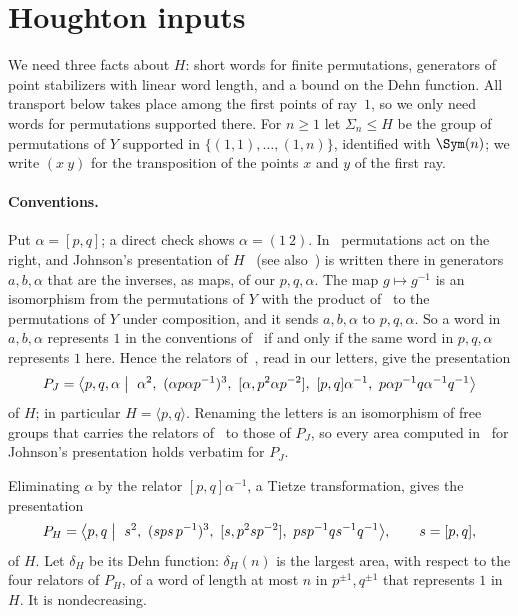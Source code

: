 \section{Houghton inputs}\label{sec:houghton}

We need three facts about $H$: short words for finite permutations, generators of point stabilizers with linear word length, and a bound on the
Dehn function. All transport below takes place among the first points of ray~$1$, so we only need words for permutations supported there. For
$n\ge1$ let $\Sigma_n\le H$ be the group of permutations of $Y$ supported in $\{(1,1),\dots,(1,n)\}$, identified with $\Sym(n)$; we write
$(x\ y)$ for the transposition of the points $x$ and $y$ of the first ray.

\paragraph{Conventions.} Put $\alpha=[p,q]$; a direct check shows $\alpha=(1\ 2)$. In~\cite{DouglasMghirbiA} permutations act on the right,
and Johnson's presentation of $H$~\cite{Johnson1999} (see also~\cite[Theorem~2.8]{Lee2012}) is written there in generators $a,b,\alpha$ that are the inverses, as maps,
of our $p,q,\alpha$. The map $g\mapsto g^{-1}$ is an isomorphism from the permutations of $Y$ with the product of~\cite{DouglasMghirbiA} to the
permutations of $Y$ under composition, and it sends $a,b,\alpha$ to $p,q,\alpha$. So a word in $a,b,\alpha$ represents $1$ in the conventions
of~\cite{DouglasMghirbiA} if and only if the same word in $p,q,\alpha$ represents $1$ here. Hence the relators of~\cite[Section~2]{DouglasMghirbiA},
read in our letters, give the presentation
\begin{equation}\label{eq:johnson}
P_J=\bigl\langle p,q,\alpha\bigm|\ \alpha^2,\ (\alpha p\alpha p^{-1})^3,\ [\alpha,p^2\alpha p^{-2}],\ [p,q]\alpha^{-1},\ p\alpha p^{-1}q\alpha^{-1}q^{-1}\bigr\rangle
\end{equation}
of $H$; in particular $H=\langle p,q\rangle$. Renaming the letters is an isomorphism of free groups that carries the relators
of~\cite{DouglasMghirbiA} to those of $P_J$, so every area computed in~\cite{DouglasMghirbiA} for Johnson's presentation holds verbatim for $P_J$.

Eliminating $\alpha$ by the relator $[p,q]\alpha^{-1}$, a Tietze transformation, gives the presentation
\begin{equation}\label{eq:PH}
P_H=\bigl\langle p,q\bigm|\ s^2,\ (sps\,p^{-1})^3,\ [s,p^2sp^{-2}],\ psp^{-1}qs^{-1}q^{-1}\bigr\rangle,\qquad s=[p,q],
\end{equation}
of $H$. Let $\delta_H$ be its Dehn function: $\delta_H(n)$ is the largest area, with respect to the four relators of $P_H$, of a word of length at most
$n$ in $p^{\pm1},q^{\pm1}$ that represents $1$ in $H$. It is nondecreasing.

